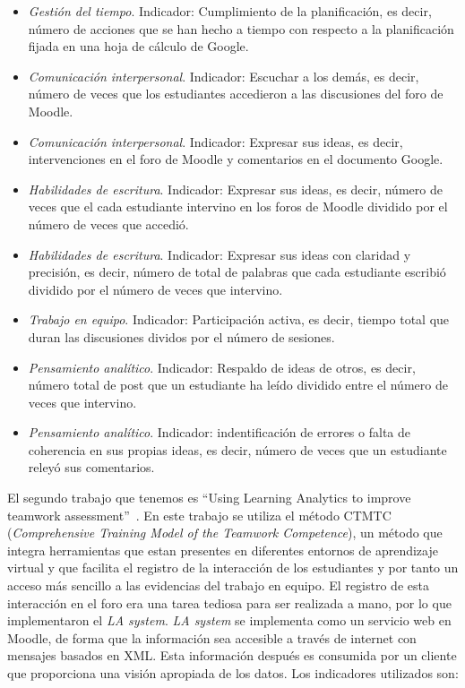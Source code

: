 \begin{itemize}
\item \emph{Gestión del tiempo}. Indicador: Cumplimiento de la planificación, es decir, número de acciones que se han hecho a tiempo con respecto a la planificación fijada en una hoja de cálculo de Google.
\item \emph{Comunicación interpersonal}. Indicador: Escuchar a los demás, es decir, número de veces que los estudiantes accedieron a las discusiones del foro de Moodle.
\item \emph{Comunicación interpersonal}. Indicador: Expresar sus ideas, es decir, intervenciones en el foro de Moodle y comentarios en el documento Google.
\item \emph{Habilidades de escritura}. Indicador: Expresar sus ideas, es decir, número de veces que el cada estudiante intervino en los foros de Moodle dividido por el número de veces que accedió.
\item \emph{Habilidades de escritura}. Indicador: Expresar sus ideas con claridad y precisión, es decir, número de total de palabras que cada estudiante escribió dividido por el número de veces que intervino.
\item \emph{Trabajo en equipo}. Indicador: Participación activa, es decir, tiempo total que duran las discusiones dividos por el número de sesiones.
\item \emph{Pensamiento analítico}. Indicador: Respaldo de ideas de otros, es decir, número total de post que un estudiante ha leído dividido entre el número de veces que intervino.
\item \emph{Pensamiento analítico}. Indicador: indentificación de errores o falta de coherencia en sus propias ideas, es decir, número de veces que un estudiante releyó sus comentarios.
\end{itemize}

\bigskip
El segundo trabajo que tenemos es “Using Learning Analytics to improve teamwork assessment”~\cite{fidalgo:2015}. En este trabajo se utiliza el método CTMTC (\emph{Comprehensive Training Model of the Teamwork Competence}), un método que integra herramientas que estan presentes en diferentes entornos de aprendizaje virtual y que facilita el registro de la interacción de los estudiantes y por tanto un acceso más sencillo a las evidencias del trabajo en equipo. El registro de esta interacción en el foro era una tarea tediosa para ser realizada a mano, por lo que implementaron el \emph{LA system}. \emph{LA system} se implementa como un servicio web en Moodle, de forma que la información sea accesible a través de internet con mensajes basados en XML. Esta información después es consumida por un cliente que proporciona una visión apropiada de los datos. Los indicadores utilizados son:

